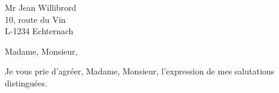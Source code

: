\documentclass[a4paper,dvipsnames,NF]{scrlttr2}
\begin{document}
\begin{letter}{Mr Jean Willibrord\\ 10, route du Vin\\ L-1234 Echternach}

\opening{Madame, Monsieur,}

\blindtext

\closing{Je vous prie d’agréer, Madame, Monsieur, l’expression de mes salutations distinguées.}

\end{letter}
\end{document}
